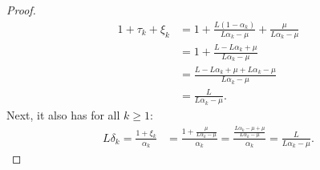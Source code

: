 \documentclass[12pt]{article}
\begin{document}
\begin{proof}
            \begin{align*}
                1 + \tau_k + \xi_k &= 
                1 + \frac{L(1 - \alpha_k)}{L \alpha_k - \mu} 
                + \frac{\mu}{L \alpha_k - \mu}
                \\
                &= 
                1 + \frac{L - L \alpha_k + \mu}{L\alpha_k - \mu}
                \\
                &= 
                \frac{L - L \alpha_k + \mu + L \alpha_k - \mu}{L\alpha_k - \mu}
                \\
                &= \frac{L}{L\alpha_k - \mu}. 
            \end{align*}
            Next, it also has for all $k \ge 1$: 
            \begin{align*}
                L\delta_k = \frac{1 + \xi_k}{\alpha_k}
                &= 
                \frac{1 + \frac{\mu}{L\alpha_k - \mu}}{\alpha_k}
                = 
                \frac{\frac{L\alpha_k - \mu + \mu}{L \alpha_k - \mu}}{\alpha_k}
                = 
                \frac{L}{L\alpha_k - \mu}.
            \end{align*}
            
        \end{proof}
    
\end{document}
